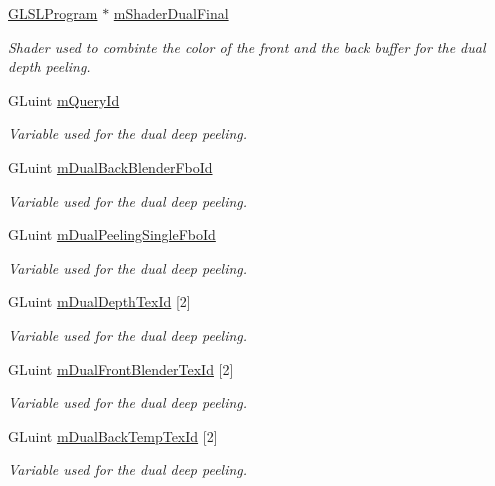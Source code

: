 \begin{DoxyCompactItemize}
\hyperlink{class_g_l_s_l_program}{G\+L\+S\+L\+Program} $\ast$ \hyperlink{class_g_l_canvas_a3da4afa0d1f292dddd869dffc7b5e5ec}{m\+Shader\+Dual\+Final}
\begin{DoxyCompactList}\small\item\em Shader used to combinte the color of the front and the back buffer for the dual depth peeling. \end{DoxyCompactList}\item 
G\+Luint \hyperlink{class_g_l_canvas_aadd45b922f81b641e051b497c15c6c24}{m\+Query\+Id}
\begin{DoxyCompactList}\small\item\em Variable used for the dual deep peeling. \end{DoxyCompactList}\item 
G\+Luint \hyperlink{class_g_l_canvas_a6e92661f8370a1ad77b1b41cd28ea70d}{m\+Dual\+Back\+Blender\+Fbo\+Id}
\begin{DoxyCompactList}\small\item\em Variable used for the dual deep peeling. \end{DoxyCompactList}\item 
G\+Luint \hyperlink{class_g_l_canvas_ad96b247e24596c3b7bcf8e304db293e2}{m\+Dual\+Peeling\+Single\+Fbo\+Id}
\begin{DoxyCompactList}\small\item\em Variable used for the dual deep peeling. \end{DoxyCompactList}\item 
G\+Luint \hyperlink{class_g_l_canvas_a379e8f67bbbe059c0f4e6ebb50f7eefd}{m\+Dual\+Depth\+Tex\+Id} \mbox{[}2\mbox{]}
\begin{DoxyCompactList}\small\item\em Variable used for the dual deep peeling. \end{DoxyCompactList}\item 
G\+Luint \hyperlink{class_g_l_canvas_a204cdcacc1b89bf9b0e8b64f577f1a11}{m\+Dual\+Front\+Blender\+Tex\+Id} \mbox{[}2\mbox{]}
\begin{DoxyCompactList}\small\item\em Variable used for the dual deep peeling. \end{DoxyCompactList}\item 
G\+Luint \hyperlink{class_g_l_canvas_a084bdb1e6147fdec4b6cea40d1cd88ba}{m\+Dual\+Back\+Temp\+Tex\+Id} \mbox{[}2\mbox{]}
\begin{DoxyCompactList}\small\item\em Variable used for the dual deep peeling. \end{DoxyCompactList}\item 

\end{DoxyCompactItemize}
